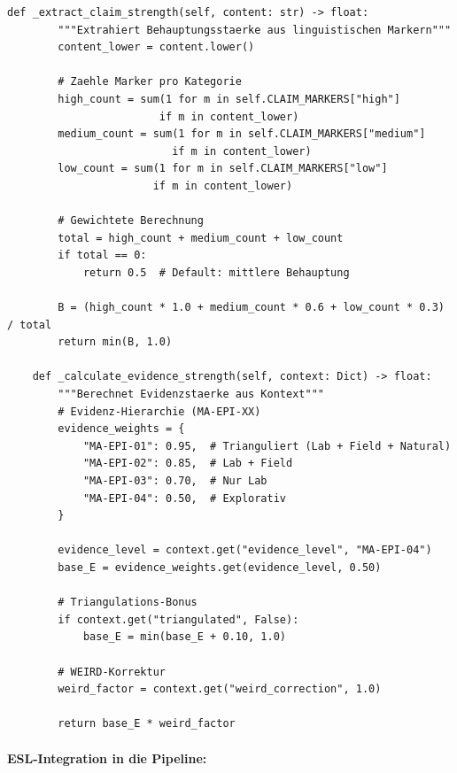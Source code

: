 \begin{lstlisting}[caption={ESL-Modul: Referenzimplementierung}]
    def _extract_claim_strength(self, content: str) -> float:
        """Extrahiert Behauptungsstaerke aus linguistischen Markern"""
        content_lower = content.lower()

        # Zaehle Marker pro Kategorie
        high_count = sum(1 for m in self.CLAIM_MARKERS["high"]
                        if m in content_lower)
        medium_count = sum(1 for m in self.CLAIM_MARKERS["medium"]
                          if m in content_lower)
        low_count = sum(1 for m in self.CLAIM_MARKERS["low"]
                       if m in content_lower)

        # Gewichtete Berechnung
        total = high_count + medium_count + low_count
        if total == 0:
            return 0.5  # Default: mittlere Behauptung

        B = (high_count * 1.0 + medium_count * 0.6 + low_count * 0.3) / total
        return min(B, 1.0)

    def _calculate_evidence_strength(self, context: Dict) -> float:
        """Berechnet Evidenzstaerke aus Kontext"""
        # Evidenz-Hierarchie (MA-EPI-XX)
        evidence_weights = {
            "MA-EPI-01": 0.95,  # Trianguliert (Lab + Field + Natural)
            "MA-EPI-02": 0.85,  # Lab + Field
            "MA-EPI-03": 0.70,  # Nur Lab
            "MA-EPI-04": 0.50,  # Explorativ
        }

        evidence_level = context.get("evidence_level", "MA-EPI-04")
        base_E = evidence_weights.get(evidence_level, 0.50)

        # Triangulations-Bonus
        if context.get("triangulated", False):
            base_E = min(base_E + 0.10, 1.0)

        # WEIRD-Korrektur
        weird_factor = context.get("weird_correction", 1.0)

        return base_E * weird_factor
\end{lstlisting}

\paragraph{ESL-Integration in die Pipeline:}

